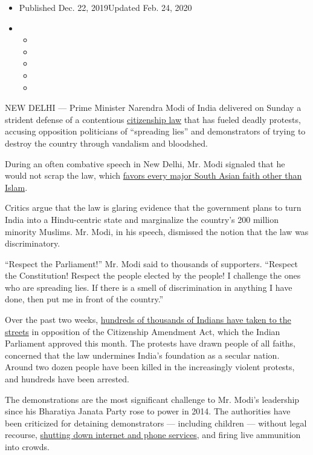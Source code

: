 \begin{itemize}
\item
  Published Dec. 22, 2019Updated Feb. 24, 2020
\item
  \begin{itemize}
  \item
  \item
  \item
  \item
  \item
  \end{itemize}
\end{itemize}

NEW DELHI --- Prime Minister Narendra Modi of India delivered on Sunday
a strident defense of a contentious
\href{https://www.nytimes.com/2019/12/11/world/asia/india-muslims-citizenship-narendra-modi.html}{citizenship
law} that has fueled deadly protests, accusing opposition politicians of
``spreading lies'' and demonstrators of trying to destroy the country
through vandalism and bloodshed.

During an often combative speech in New Delhi, Mr. Modi signaled that he
would not scrap the law, which
\href{https://www.nytimes.com/2019/12/09/world/asia/india-muslims-citizenship-narendra-modi.html}{favors
every major South Asian faith other than Islam}.

Critics argue that the law is glaring evidence that the government plans
to turn India into a Hindu-centric state and marginalize the country's
200 million minority Muslims. Mr. Modi, in his speech, dismissed the
notion that the law was discriminatory.

``Respect the Parliament!'' Mr. Modi said to thousands of supporters.
``Respect the Constitution! Respect the people elected by the people! I
challenge the ones who are spreading lies. If there is a smell of
discrimination in anything I have done, then put me in front of the
country.''

Over the past two weeks,
\href{https://www.nytimes.com/2019/12/16/world/asia/india-citizenship-protests.html}{hundreds
of thousands of Indians have taken to the streets} in opposition of the
Citizenship Amendment Act, which the Indian Parliament approved this
month. The protests have drawn people of all faiths, concerned that the
law undermines India's foundation as a secular nation. Around two dozen
people have been killed in the increasingly violent protests, and
hundreds have been arrested.

The demonstrations are the most significant challenge to Mr. Modi's
leadership since his Bharatiya Janata Party rose to power in 2014. The
authorities have been criticized for detaining demonstrators ---
including children --- without legal recourse,
\href{https://www.nytimes.com/2019/12/17/world/asia/india-internet-modi-protests.html}{shutting
down internet and phone services}, and firing live ammunition into
crowds.

